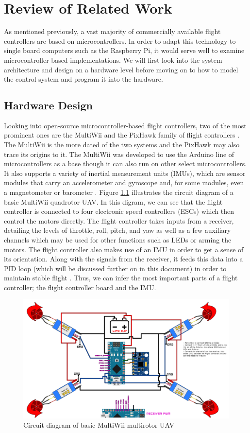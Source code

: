 \documentclass[english]{upeeei}
\begin{document}
\chapter{Review of Related Work}
As mentioned previously, a vast majority of commercially available flight controllers are based on microcontrollers. In order to
adapt this technology to single board computers such as the Raspberry Pi, it would serve well to examine microcontroller based
implementations. We will first look into the system architecture and design on a hardware level before moving on to how to model
the control system and program it into the hardware.
\section{Hardware Design}
Looking into open-source microcontroller-based flight controllers, two of the most prominent ones are the MultiWii \cite{MultiwiiFC}
and the PixHawk family of flight controllers \cite{RPiMavlink2019}. The MultiWii is the more dated of the two systems and the PixHawk
may also trace its origins to it. The MultiWii was
developed to use the Arduino line of microcontrollers as a base though it can also run on other select microcontrollers. It also
supports a variety of inertial measurement units (IMUs), which are sensor modules that carry an accelerometer and gyroscope and,
for some modules, even a magnetometer or barometer \cite{zimmerman2016}. Figure \ref{fig:multiwiiCktDiagram} illustrates the circuit
diagram of a basic MultiWii quadrotor UAV. In this digram, we can see that the flight controller is connected to four electronic speed
controllers (ESCs) which then control the motors directly. The flight controller takes inputs from a receiver, detailing the levels
of throttle, roll, pitch, and yaw as well as a few auxiliary channels which may be used for other functions such as LEDs or arming
the motors. The flight controller also makes use of an IMU in order to get a sense of its orientation. Along with the signals from
the receiver, it feeds this data into a PID loop (which will be discussed further on in this document) in order to maintain stable flight
\cite{zimmerman2016}. Thus, we can infer the most important parts of a flight controller; the flight controller board and the IMU.
\begin{figure}[h]
    \centering
    \includegraphics[scale=0.5]{images/multiwii diagram.PNG}
    \caption{Circuit diagram of basic MultiWii multirotor UAV \cite{MultiwiiFC}}
    \label{fig:multiwiiCktDiagram}
\end{figure}
\end{document}
